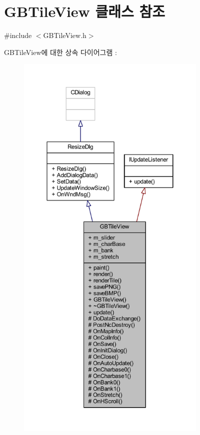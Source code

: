 \hypertarget{class_g_b_tile_view}{}\section{G\+B\+Tile\+View 클래스 참조}
\label{class_g_b_tile_view}


{\ttfamily \#include $<$G\+B\+Tile\+View.\+h$>$}



G\+B\+Tile\+View에 대한 상속 다이어그램 \+: \nopagebreak
\begin{figure}[H]
\begin{center}
\leavevmode
\includegraphics[height=550pt]{class_g_b_tile_view__inherit__graph}
\end{center}
\end{figure}


